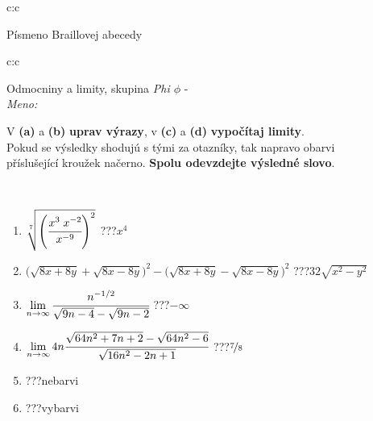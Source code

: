 \documentclass[10pt]{report}
\begin{document}
\begin{tabular}{c:c}
\begin{minipage}[c][104.5mm][t]{0.5\linewidth}
\begin{center}
\begin{minipage}{0.20\linewidth}
\begin{center}
{\small Písmeno Braillovej abecedy}
\end{center}
\end{minipage}
\end{center}
\end{minipage}
%
\end{tabular}
\newpage
\thispagestyle{empty}
\begin{tabular}{c:c}
\begin{minipage}[c][104.5mm][t]{0.5\linewidth}
\begin{center}
\vspace{7mm}
{\huge Odmocniny a limity, skupina \textit{Phi $\phi$} -}\\[5mm]
\textit{Meno:}\phantom{xxxxxxxxxxxxxxxxxxxxxxxxxxxxxxxxxxxxxxxxxxxxxxxxxxxxxxxxxxxxxxxxx}\\[5mm]
\begin{minipage}{0.95\linewidth}
\begin{center}
V \textbf{(a)} a \textbf{(b)} \textbf{uprav výrazy}, v \textbf{(c)} a \textbf{(d)} \textbf{vypočítaj limity}.\\Pokud se výsledky shodujú s tými za otazníky, tak napravo obarvi\\příslušející kroužek načerno. \textbf{Spolu odevzdejte výsledné slovo}.
\end{center}
\end{minipage}
\\[1mm]
\begin{minipage}{0.79\linewidth}
\begin{center}
\begin{varwidth}{\linewidth}
\begin{enumerate}
\small
\item $\sqrt[7]{\left(\cfrac{x^{3}\;x^{-2}}{x^{-9}}\right)^{2}}$\quad \dotfill\; ???\;\dotfill \quad $x^{4}$
\item {\footnotesize{\scriptsize$\big(\sqrt{8x+8y}+\sqrt{8x-8y}\big)^2-\big(\sqrt{8x+8y}-\sqrt{8x-8y}\big)^2$}\quad \dotfill\; ???\;\dotfill \quad $32\sqrt{x^2-y^2}$}
\item $\lim\limits_{n\to\infty}\cfrac{n^{-1/2}}{\sqrt{9n-4}-\sqrt{9n-2}}$\quad \dotfill\; ???\;\dotfill \quad $-\infty$
\item $\lim\limits_{n\to\infty}4n\cfrac{\sqrt{64n^2+7n+2}-\sqrt{64n^2-6}}{\sqrt{16n^2-2n+1}}$\quad \dotfill\; ???\;\dotfill \quad $\nicefrac{7}{8}$
\item \quad \dotfill\; ???\;\dotfill \quad nebarvi
\item \quad \dotfill\; ???\;\dotfill \quad vybarvi

\end{enumerate}
\end{varwidth}
\end{center}
\end{minipage}
\end{center}
\end{minipage}
\end{tabular}
\end{document}
